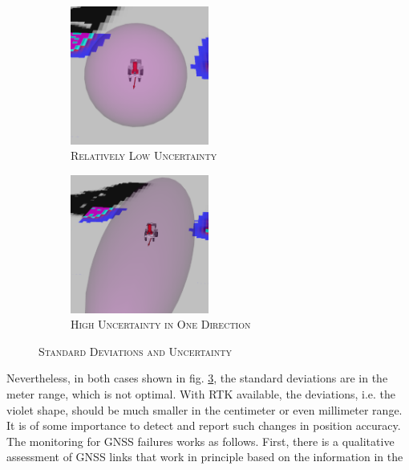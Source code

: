 \documentclass[english, master, utf8]{base/thesis_KBS}
\newcommand{\code}{\collectverb{\codebox}}
\begin{document}
\begin{figure}[H]
    \centering
    \begin{subfigure}[b]{0.49\textwidth}
        \centering
        \includegraphics[width=0.5\textwidth]{pics/GNSS_cov_low.png}
        \caption{\textsc{Relatively Low Uncertainty}}
        \label{fig:low_uncertainty}
    \end{subfigure}
    \hfill
    \begin{subfigure}[b]{0.49\textwidth}
        \centering
        \includegraphics[width=0.5\textwidth]{pics/GNSS_cov_high.png}
        \caption{\textsc{High Uncertainty in One Direction}}
        \label{fig:high_uncertainty}
    \end{subfigure}
\caption{\textsc{Standard Deviations and Uncertainty}}
\label{fig:uncertainty_shape}
\end{figure}
\noindent
Nevertheless, in both cases shown in fig. \ref{fig:uncertainty_shape}, the standard deviations are in the meter range, which is not optimal. With RTK available, the deviations,
i.e. the violet shape, should be much smaller in the centimeter or even millimeter range. It is of some importance to detect and report such changes in position accuracy.
The monitoring for GNSS failures works as follows. First, there is a qualitative assessment of GNSS links that work in principle based on the information in the \code{NavSatFix}
\end{document}
